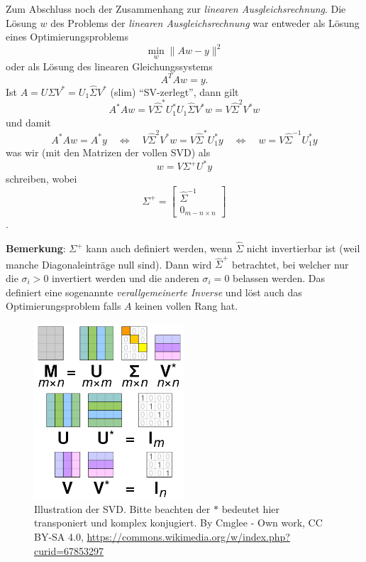 \documentclass[
]{book}
\theoremstyle{definition}
\theoremstyle{definition}
\theoremstyle{definition}
\theoremstyle{definition}
\theoremstyle{remark}
\begin{document}
Zum Abschluss noch der Zusammenhang zur \emph{linearen Ausgleichsrechnung}.
Die Lösung \(w\) des Problems der \emph{linearen Ausgleichsrechnung} war entweder als Lösung eines Optimierungsproblems
\begin{equation*}
\min_{w} \| Aw - y \|^2
\end{equation*}
oder als Lösung des linearen Gleichungssystems
\begin{equation*}
A^TAw=y.
\end{equation*}
Ist \(A=U\Sigma V^*=U_1\hat \Sigma V^*\) (slim) ``SV-zerlegt'', dann gilt
\begin{equation*}
A^*Aw = V\hat \Sigma^*U_1^*U_1\hat \Sigma V^*w = V\hat \Sigma^2 V^* w
\end{equation*}
und damit
\begin{equation*}
A^*Aw = A^*y \quad \Leftrightarrow \quad V\hat \Sigma^2 V^*w  = V\hat \Sigma^*U_1^*y \quad \Leftrightarrow \quad w = V\hat \Sigma^{-1} U_1^*y
\end{equation*}
was wir (mit den Matrizen der vollen SVD) als
\begin{equation*}
w = V \Sigma^+ U^*y
\end{equation*}
schreiben, wobei
\begin{equation*}
\Sigma^+ = \begin{bmatrix}
\hat \Sigma^{-1} \\ 0_{m-n \times n}
\end{bmatrix}
\end{equation*}
.

\textbf{Bemerkung}: \(\Sigma^+\) kann auch definiert werden, wenn \(\hat \Sigma\) nicht invertierbar ist (weil manche Diagonaleinträge null sind). Dann wird \(\hat \Sigma^+\) betrachtet, bei welcher nur die \(\sigma_i>0\) invertiert werden und die anderen \(\sigma_i=0\) belassen werden. Das definiert eine sogenannte \emph{verallgemeinerte Inverse} und löst auch das Optimierungsproblem falls \(A\) keinen vollen Rang hat.

\begin{figure}
\hypertarget{fig-SVD}{%
\centering
\includegraphics[width=0.5\textwidth,height=\textheight]{bilder/06_412px-Singular_value_decomposition_visualisation.svg.png}
\caption{Illustration der SVD. Bitte beachten der \(*\) bedeutet hier transponiert und komplex konjugiert. By Cmglee - Own work, CC BY-SA 4.0, \url{https://commons.wikimedia.org/w/index.php?curid=67853297}}\label{fig-SVD}
}
\end{figure}
\end{document}
